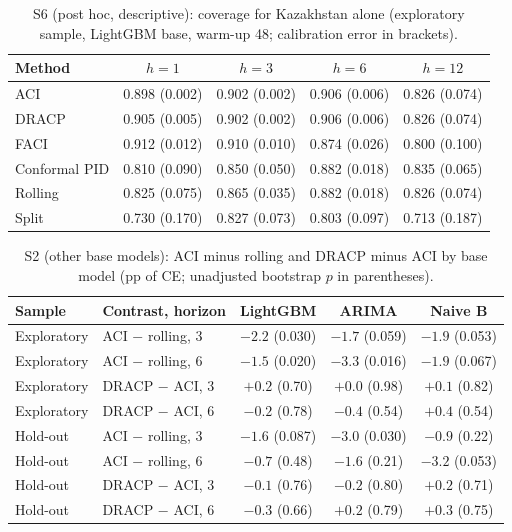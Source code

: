 \begin{table}[H]
\centering
\caption{S6 (post hoc, descriptive): coverage for Kazakhstan alone (exploratory sample, LightGBM base, warm-up 48; calibration error in brackets).}
\label{tab:kz}
\small
\begin{tabular}{@{}lcccc@{}}
\toprule
Method & $h=1$ & $h=3$ & $h=6$ & $h=12$ \\
\midrule
ACI & 0.898 (0.002) & 0.902 (0.002) & 0.906 (0.006) & 0.826 (0.074) \\
DRACP & 0.905 (0.005) & 0.902 (0.002) & 0.906 (0.006) & 0.826 (0.074) \\
FACI & 0.912 (0.012) & 0.910 (0.010) & 0.874 (0.026) & 0.800 (0.100) \\
Conformal PID & 0.810 (0.090) & 0.850 (0.050) & 0.882 (0.018) & 0.835 (0.065) \\
Rolling & 0.825 (0.075) & 0.865 (0.035) & 0.882 (0.018) & 0.826 (0.074) \\
Split & 0.730 (0.170) & 0.827 (0.073) & 0.803 (0.097) & 0.713 (0.187) \\
\bottomrule
\end{tabular}
\end{table}

\begin{table}[H]
\centering
\caption{S2 (other base models): ACI minus rolling and DRACP minus ACI by base model (pp of CE; unadjusted bootstrap $p$ in parentheses).}
\label{tab:s2full}
\small
\begin{tabular}{@{}llccc@{}}
\toprule
Sample & Contrast, horizon & LightGBM & ARIMA & Naive B \\
\midrule
Exploratory & ACI $-$ rolling, 3 & $-2.2$ (0.030) & $-1.7$ (0.059) & $-1.9$ (0.053) \\
Exploratory & ACI $-$ rolling, 6 & $-1.5$ (0.020) & $-3.3$ (0.016) & $-1.9$ (0.067) \\
Exploratory & DRACP $-$ ACI, 3 & $+0.2$ (0.70) & $+0.0$ (0.98) & $+0.1$ (0.82) \\
Exploratory & DRACP $-$ ACI, 6 & $-0.2$ (0.78) & $-0.4$ (0.54) & $+0.4$ (0.54) \\
Hold-out & ACI $-$ rolling, 3 & $-1.6$ (0.087) & $-3.0$ (0.030) & $-0.9$ (0.22) \\
Hold-out & ACI $-$ rolling, 6 & $-0.7$ (0.48) & $-1.6$ (0.21) & $-3.2$ (0.053) \\
Hold-out & DRACP $-$ ACI, 3 & $-0.1$ (0.76) & $-0.2$ (0.80) & $+0.2$ (0.71) \\
Hold-out & DRACP $-$ ACI, 6 & $-0.3$ (0.66) & $+0.2$ (0.79) & $+0.3$ (0.75) \\
\bottomrule
\end{tabular}
\end{table}

